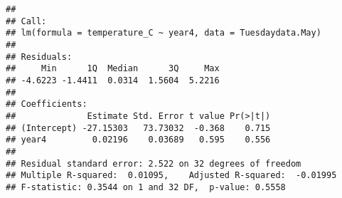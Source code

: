 \documentclass[]{article}
\newenvironment{Shaded}{\begin{snugshade}}{\end{snugshade}}
\newcommand{\CommentTok}[1]{\textcolor[rgb]{0.56,0.35,0.01}{\textit{#1}}}
\newcommand{\DataTypeTok}[1]{\textcolor[rgb]{0.13,0.29,0.53}{#1}}
\newcommand{\DecValTok}[1]{\textcolor[rgb]{0.00,0.00,0.81}{#1}}
\newcommand{\FloatTok}[1]{\textcolor[rgb]{0.00,0.00,0.81}{#1}}
\newcommand{\KeywordTok}[1]{\textcolor[rgb]{0.13,0.29,0.53}{\textbf{#1}}}
\newcommand{\NormalTok}[1]{#1}
\newcommand{\OperatorTok}[1]{\textcolor[rgb]{0.81,0.36,0.00}{\textbf{#1}}}
\newcommand{\StringTok}[1]{\textcolor[rgb]{0.31,0.60,0.02}{#1}}
\begin{document}
\begin{Shaded}
\end{Shaded}

\begin{verbatim}
## 
## Call:
## lm(formula = temperature_C ~ year4, data = Tuesdaydata.May)
## 
## Residuals:
##     Min      1Q  Median      3Q     Max 
## -4.6223 -1.4411  0.0314  1.5604  5.2216 
## 
## Coefficients:
##              Estimate Std. Error t value Pr(>|t|)
## (Intercept) -27.15303   73.73032  -0.368    0.715
## year4         0.02196    0.03689   0.595    0.556
## 
## Residual standard error: 2.522 on 32 degrees of freedom
## Multiple R-squared:  0.01095,    Adjusted R-squared:  -0.01995 
## F-statistic: 0.3544 on 1 and 32 DF,  p-value: 0.5558
\end{verbatim}
\end{document}
